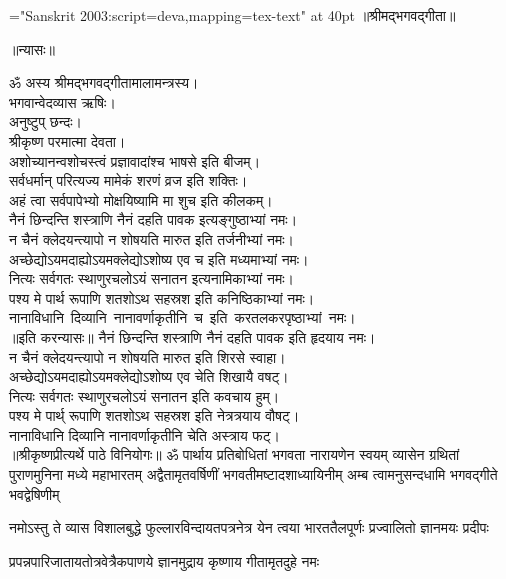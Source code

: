 \large
\centerline{\font\x="Sanskrit 2003:script=deva,mapping=tex-text" at 40pt \x ॥श्रीमद्भगवद्गीता॥}
\bigskip
\centerline{\Large ॥न्यासः॥}
\medskip
{}
ॐ अस्य श्रीमद्‌भगवद्‌गीतामालामन्त्रस्य।\\ 
भगवान्वेदव्यास ऋषिः।\\
अनुष्टुप्‌ छन्दः।\\
श्रीकृष्ण परमात्मा देवता।\\
अशोच्यानन्वशोचस्त्वं प्रज्ञावादांश्च भाषसे इति बीजम्‌।\\
सर्वधर्मान्‌ परित्यज्य मामेकं शरणं व्रज इति शक्तिः।\\
अहं त्वा सर्वपापेभ्यो मोक्षयिष्यामि मा शुच इति कीलकम्‌।\\
नैनं छिन्दन्ति शस्त्राणि नैनं दहति पावक इत्यङ्गुष्ठाभ्यां नमः।\\
न चैनं क्लेदयन्त्यापो न शोषयति मारुत इति तर्जनीभ्यां नमः।\\
अच्छेद्योऽयमदाह्योऽयमक्लेद्योऽशोष्य एव च इति मध्यमाभ्यां नमः।\\
नित्यः सर्वगतः स्थाणुरचलोऽयं सनातन इत्यनामिकाभ्यां नमः।\\
पश्य मे पार्थ रूपाणि शतशोऽथ सहस्रश इति कनिष्ठिकाभ्यां नमः।\\
नानाविधानि~दिव्यानि~नानावर्णाकृतीनि~च~इति~करतलकरपृष्ठाभ्यां~नमः।\\
{॥इति करन्यासः॥}
\medskip
\newpage
{}
नैनं छिन्दन्ति शस्त्राणि नैनं दहति पावक इति हृदयाय नमः।\\
न चैनं क्लेदयन्त्यापो न शोषयति मारुत इति शिरसे स्वाहा।\\
अच्छेद्योऽयमदाह्योऽयमक्लेद्योऽशोष्य एव चेति शिखायै वषट्‌।\\
नित्यः सर्वगतः स्थाणुरचलोऽयं सनातन इति कवचाय हुम्‌।\\
पश्य मे पार्थ् रूपाणि शतशोऽथ सहस्रश इति नेत्रत्रयाय वौषट्‌।\\
नानाविधानि दिव्यानि नानावर्णाकृतीनि चेति अस्त्राय फट्‌।\\
{॥श्रीकृष्णप्रीत्यर्थे पाठे विनियोगः॥}
{}
\fourlineindentedshloka
{ॐ पार्थाय प्रतिबोधितां भगवता नारायणेन स्वयम्}
{व्यासेन ग्रथितां पुराणमुनिना मध्ये महाभारतम्}
{अद्वैतामृतवर्षिणीं भगवतीमष्टादशाध्यायिनीम्}
{अम्ब त्वामनुसन्दधामि भगवद्गीते भवद्वेषिणीम्}%

\twolineshloka
{नमोऽस्तु ते व्यास विशालबुद्धे फुल्लारविन्दायतपत्रनेत्र}
{येन त्वया भारततैलपूर्णः प्रज्वालितो ज्ञानमयः प्रदीपः}%

\twolineshloka
{प्रपन्नपारिजातायतोत्रवेत्रैकपाणये}
{ज्ञानमुद्राय कृष्णाय गीतामृतदुहे नमः}%

